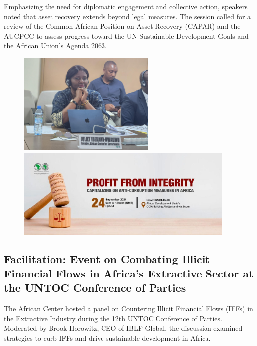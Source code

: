 \documentclass[
  letterpaper,
  DIV=11,
  numbers=noendperiod]{scrreprt}
\begin{document}
Emphasizing the need for diplomatic engagement and collective action,
speakers noted that asset recovery extends beyond legal measures. The
session called for a review of the Common African Position on Asset
Recovery (CAPAR) and the AUCPCC to assess progress toward the UN
Sustainable Development Goals and the African Union's Agenda 2063.

\begin{figure}

\begin{minipage}{0.39\linewidth}
\includegraphics[width=2.60417in,height=\textheight,keepaspectratio]{images/strengthen/12_0_afdb.jpg}\end{minipage}%
%
\begin{minipage}{0.61\linewidth}
\includegraphics[width=4.16667in,height=\textheight,keepaspectratio]{images/strengthen/12_1_afdb.jpg}\end{minipage}%

\end{figure}%

\subsection{Facilitation: Event on Combating Illicit Financial Flows in
Africa's Extractive Sector at the UNTOC Conference of
Parties}\label{facilitation-event-on-combating-illicit-financial-flows-in-africas-extractive-sector-at-the-untoc-conference-of-parties}

The African Center hosted a panel on Countering Illicit Financial Flows
(IFFs) in the Extractive Industry during the 12th UNTOC Conference of
Parties. Moderated by Brook Horowitz, CEO of IBLF Global, the discussion
examined strategies to curb IFFs and drive sustainable development in
Africa.
\end{document}

